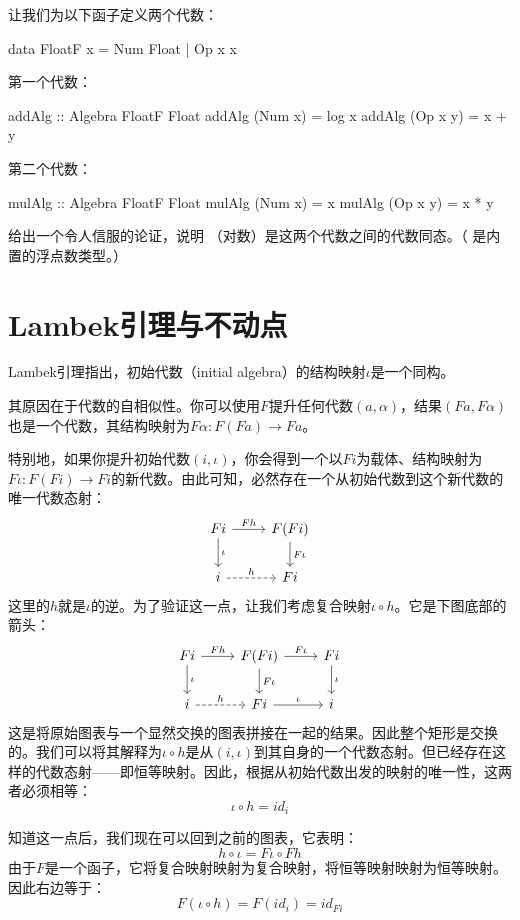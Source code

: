 \documentclass[DaoFP]{subfiles}
\begin{document}
\begin{exercise}
让我们为以下函子定义两个代数：
\begin{haskell}
data FloatF x = Num Float | Op x x
\end{haskell}
第一个代数：
\begin{haskell}
addAlg :: Algebra FloatF Float
addAlg (Num x) = log x
addAlg (Op x y) = x + y
\end{haskell}
第二个代数：
\begin{haskell}
mulAlg :: Algebra FloatF Float
mulAlg (Num x) = x
mulAlg (Op x y) = x * y
\end{haskell}
给出一个令人信服的论证，说明 （对数）是这两个代数之间的代数同态。（ 是内置的浮点数类型。）
\end{exercise}

\section{Lambek引理与不动点}

Lambek引理指出，初始代数（initial algebra）的结构映射$\iota$是一个同构。

其原因在于代数的自相似性。你可以使用$F$提升任何代数$(a, \alpha)$，结果$(F a, F \alpha)$也是一个代数，其结构映射为$F \alpha \colon F (F a) \to F a$。

特别地，如果你提升初始代数$(i, \iota)$，你会得到一个以$F i$为载体、结构映射为$F \iota \colon F (F i) \to F i$的新代数。由此可知，必然存在一个从初始代数到这个新代数的唯一代数态射：
\[
 \begin{tikzcd}
 F i 
 \arrow[r, "F h"]
 \arrow[d, "\iota"]
 & F (F i)
\arrow[d, "F \iota"]
 \\
 i
 \arrow[r, dashed, "h"]
 & F i
  \end{tikzcd}
\]
这里的$h$就是$\iota$的逆。为了验证这一点，让我们考虑复合映射$\iota \circ h$。它是下图底部的箭头：
\[
 \begin{tikzcd}
 F i 
 \arrow[r, "F h"]
 \arrow[d, "\iota"]
 & F (F i)
\arrow[d, "F \iota"]
\arrow[r, "F \iota"]
& F i
\arrow[d, "\iota"]
 \\
 i
 \arrow[r, dashed, "h"]
 & F i
 \arrow[r, "\iota"]
 & i
  \end{tikzcd}
\]
这是将原始图表与一个显然交换的图表拼接在一起的结果。因此整个矩形是交换的。我们可以将其解释为$\iota \circ h$是从$(i, \iota)$到其自身的一个代数态射。但已经存在这样的代数态射——即恒等映射。因此，根据从初始代数出发的映射的唯一性，这两者必须相等：
\[ \iota \circ h = id_i \] 

知道这一点后，我们现在可以回到之前的图表，它表明：
\[ h \circ \iota = F \iota \circ F h \]
由于$F$是一个函子，它将复合映射映射为复合映射，将恒等映射映射为恒等映射。因此右边等于：
\[ F (\iota \circ h) = F (id_i) = id_{F i} \]
\end{document}

